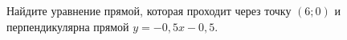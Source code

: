\begin{ex}
	\begin{condition}
		Найдите уравнение прямой, которая проходит через точку \( (6;0) \) и перпендикулярна прямой \( y=-0,5x-0,5 \).
	\end{condition}
\end{ex}
